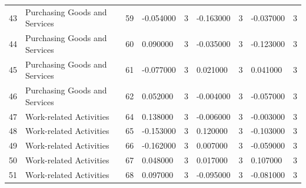 \begin{tabular}{lllllllll}
43 & Purchasing Goods and Services & 59 & -0.054000 & 3 & -0.163000 & 3 & -0.037000 & 3 \\
44 & Purchasing Goods and Services & 60 & 0.090000 & 3 & -0.035000 & 3 & -0.123000 & 3 \\
45 & Purchasing Goods and Services & 61 & -0.077000 & 3 & 0.021000 & 3 & 0.041000 & 3 \\
46 & Purchasing Goods and Services & 62 & 0.052000 & 3 & -0.004000 & 3 & -0.057000 & 3 \\
47 & Work-related Activities & 64 & 0.138000 & 3 & -0.006000 & 3 & -0.003000 & 3 \\
48 & Work-related Activities & 65 & -0.153000 & 3 & 0.120000 & 3 & -0.103000 & 3 \\
49 & Work-related Activities & 66 & -0.162000 & 3 & 0.007000 & 3 & -0.059000 & 3 \\
50 & Work-related Activities & 67 & 0.048000 & 3 & 0.017000 & 3 & 0.107000 & 3 \\
51 & Work-related Activities & 68 & 0.097000 & 3 & -0.095000 & 3 & -0.081000 & 3 \\
\bottomrule
\end{tabular}
